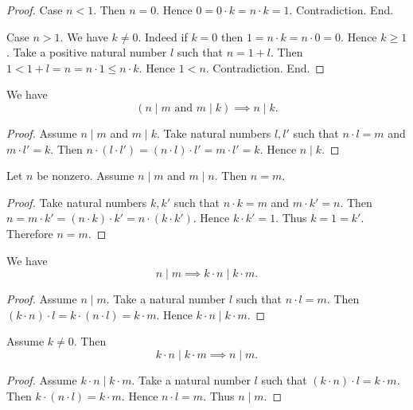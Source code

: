 \documentclass[../../arithmetic.ftl.tex]{subfiles}
\begin{document}
\begin{forthel}
\begin{proof}
      Case $n < 1$.
        Then $n = 0$.
        Hence $0 = 0 \cdot k = n \cdot k = 1$.
        Contradiction.
      End.

      Case $n > 1$.
        We have $k \neq 0$.
        Indeed if $k = 0$ then $1 = n \cdot k = n \cdot 0 = 0$.
        Hence $k \geq 1$.
        Take a positive natural number $l$ such that $n = 1 + l$.
        Then $1 < 1 + l = n = n \cdot 1 \leq n \cdot k$.
        Hence $1 < n$.
        Contradiction.
      End.
    \end{proof}

    \begin{proposition}\label{Arithmetic_03_01_364584}
      We have \[ (\text{$n \mid m$ and $m \mid k$}) \implies n \mid k. \]
    \end{proposition}
    \begin{proof}
      Assume $n \mid m$ and $m \mid k$.
      Take natural numbers $l,l'$ such that $n \cdot l = m$ and $m \cdot l' = k$.
      Then $n \cdot (l \cdot l') = (n \cdot l) \cdot l' = m \cdot l' = k$.
      Hence $n \mid k$.
    \end{proof}

    \begin{proposition}\label{Arithmetic_03_01_185910}
      Let $n$ be nonzero.
      Assume $n \mid m$ and $m \mid n$.
      Then $n = m$.
    \end{proposition}
    \begin{proof}
      Take natural numbers $k,k'$ such that $n \cdot k = m$ and $m \cdot k' = n$.
      Then $n = m \cdot k' = (n \cdot k) \cdot k' = n \cdot (k \cdot k')$.
      Hence $k \cdot k' = 1$.
      Thus $k = 1 = k'$.
      Therefore $n = m$.
    \end{proof}

    \begin{proposition}\label{Arithmetic_03_01_710814}
      We have \[ n \mid m \implies k \cdot n \mid k \cdot m. \]
    \end{proposition}
    \begin{proof}
      Assume $n \mid m$.
      Take a natural number $l$ such that $n \cdot l = m$.
      Then $(k \cdot n) \cdot l = k \cdot (n \cdot l) = k \cdot m$.
      Hence $k \cdot n \mid k \cdot m$.
    \end{proof}

    \begin{proposition}\label{Arithmetic_03_01_382863}
      Assume $k \neq 0$.
      Then \[ k \cdot n \mid k \cdot m \implies n \mid m. \]
    \end{proposition}
    \begin{proof}
      Assume $k \cdot n \mid k \cdot m$.
      Take a natural number $l$ such that $(k \cdot n) \cdot l = k \cdot m$.
      Then $k \cdot (n \cdot l) = k \cdot m$.
      Hence $n \cdot l = m$.
      Thus $n \mid m$.
    \end{proof}


\end{forthel}
\end{document}
